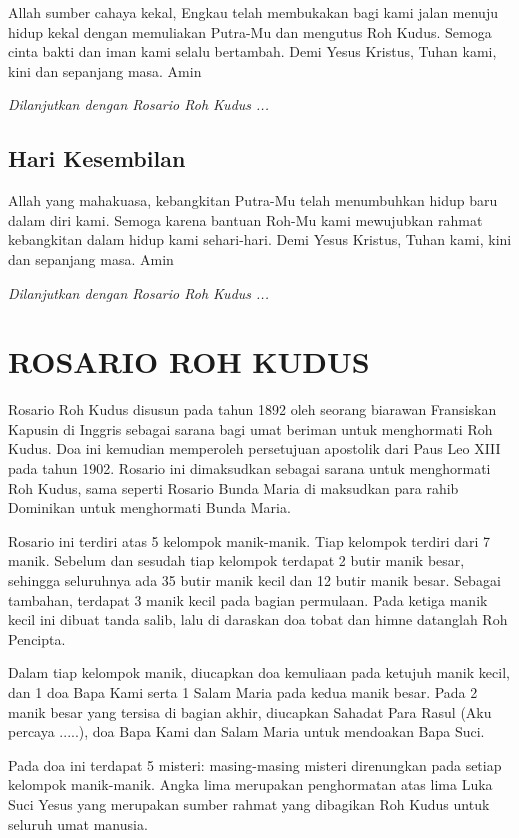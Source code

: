     Allah sumber cahaya kekal, Engkau telah membukakan bagi kami jalan menuju hidup kekal dengan memuliakan Putra-Mu dan mengutus Roh Kudus. Semoga cinta bakti dan iman kami selalu bertambah. Demi Yesus Kristus, Tuhan kami, kini dan sepanjang masa. Amin
    
    \emph{Dilanjutkan dengan Rosario Roh Kudus ...}
    
\subsection*{Hari Kesembilan}

    Allah yang mahakuasa, kebangkitan Putra-Mu telah menumbuhkan hidup baru dalam diri kami. Semoga karena bantuan Roh-Mu kami mewujubkan rahmat kebangkitan dalam hidup kami sehari-hari. Demi Yesus Kristus, Tuhan kami, kini dan sepanjang masa. Amin
    
    \emph{Dilanjutkan dengan Rosario Roh Kudus ...}
    
\section{ROSARIO ROH KUDUS}

\scriptsize
Rosario Roh Kudus disusun pada tahun 1892 oleh seorang biarawan Fransiskan Kapusin di Inggris sebagai sarana bagi umat beriman untuk menghormati Roh Kudus. Doa ini kemudian memperoleh persetujuan apostolik dari Paus Leo XIII pada tahun 1902. Rosario ini dimaksudkan sebagai sarana untuk menghormati Roh Kudus, sama seperti Rosario Bunda Maria di maksudkan para rahib Dominikan untuk menghormati Bunda Maria.

Rosario ini terdiri atas 5 kelompok manik-manik. Tiap kelompok terdiri dari 7 manik. Sebelum dan sesudah tiap kelompok terdapat 2 butir manik besar, sehingga seluruhnya ada 35 butir manik kecil dan 12 butir manik besar. Sebagai tambahan, terdapat 3 manik kecil pada bagian permulaan. Pada ketiga manik kecil ini dibuat tanda salib, lalu di daraskan doa tobat dan himne datanglah Roh Pencipta.

Dalam tiap kelompok manik, diucapkan doa kemuliaan pada ketujuh manik kecil, dan 1 doa Bapa Kami serta 1 Salam Maria pada kedua manik besar. Pada 2 manik besar yang tersisa di bagian akhir, diucapkan Sahadat Para Rasul (Aku percaya .....), doa Bapa Kami dan Salam Maria untuk mendoakan Bapa Suci.

Pada doa ini terdapat 5 misteri: masing-masing misteri direnungkan pada setiap kelompok manik-manik. Angka lima merupakan penghormatan atas lima Luka Suci Yesus yang merupakan sumber rahmat yang dibagikan Roh Kudus untuk seluruh umat manusia.

